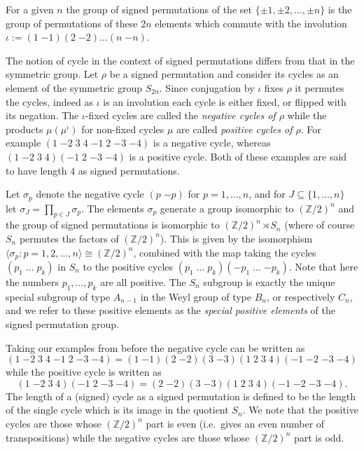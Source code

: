 \documentclass[11pt,a4paper]{article}
\def\Z{\mathbb{Z}}
\begin{document}
For a given $n$ the group of signed permutations of the set $\{\pm 1, \pm 2,\dots ,\pm n\}$ is the group of permutations of these $2n$ elements which commute with the involution $\iota:=(1\;{-1})(2\;{-2})\dots(n\;{-n})$.

The notion of cycle in the context of signed permutations differs from that in the symmetric group. Let $\rho$ be a signed permutation and consider its cycles as an element of the symmetric group $S_{2n}$. Since conjugation by $\iota$ fixes $\rho$ it permutes the cycles, indeed as $\iota$ is an involution each cycle is either fixed, or flipped with its negation.  The $\iota$-fixed cycles are called the \emph{negative cycles of $\rho$} while the products $\mu(\mu^\iota)$ for non-fixed cycles $\mu$ are called \emph{positive cycles of $\rho$}.  For example $(1\;{-2}\;3\;4\;{-1}\;{2}\;{-3}\;{-4})$ is a negative cycle, whereas $(1\;{-2}\;3\;4)({-1}\;{2}\;{-3}\;{-4})$ is a positive cycle. Both of these examples are said to have length $4$  as signed permutations.

Let $\sigma_p$ denote the negative cycle $(p\;{-p})$ for $p=1,\dots,n$, and for $J\subseteq\{1,\dots,n\}$ let $\sigma_J=\prod_{p\in J} \sigma_p$. The elements $\sigma_p$ generate a group isomorphic to $(\Z/2)^n$ and the group of signed permutations is isomorphic to $(\Z/2)^n\rtimes S_n$ (where of course $S_n$ permutes the factors of $(\Z/2)^n$). This is given by the isomorphism $\langle \sigma_p : p=1,2,\dots,n\rangle\cong (\Z/2)^n$, combined with the map taking the cycles $(p_1\;\dots\;p_k)$ in $S_n$ to the positive cycles $(p_1\;\dots\;p_k)({-p_1}\;\dots\;{-p_k})$. Note that here the numbers $p_1,\dots,p_k$ are all positive. The $S_n$ subgroup is exactly the unique special subgroup of type $A_{n-1}$ in the Weyl group of type $B_n$, or respectively $C_n$, and we refer to these positive elements as the \emph{special positive elements} of the signed permutation group.

Taking our examples from before the negative cycle can be written as 
\[(1\;{-2}\;3\;4\;{-1}\;{2}\;{-3}\;{-4})=(1\;{-1})(2\;{-2})(3\;{-3})(1\;2\;3\;4)({-1}\;{-2}\;{-3}\;{-4})\]
while the positive cycle is written as \[(1\;{-2}\;3\;4)({-1}\;{2}\;{-3}\;{-4})=(2\;{-2})(3\;{-3})(1\;2\;3\;4)({-1}\;{-2}\;{-3}\;{-4}).\]
The length of a (signed) cycle as a signed permutation is defined to be the length of the single cycle which is its image in the quotient $S_n$. We note that the positive cycles are those whose $(\Z/2)^n$ part is even (i.e.\ gives an even number of transpositions) while the negative cycles are those whose $(\Z/2)^n$ part is odd.
\end{document}
